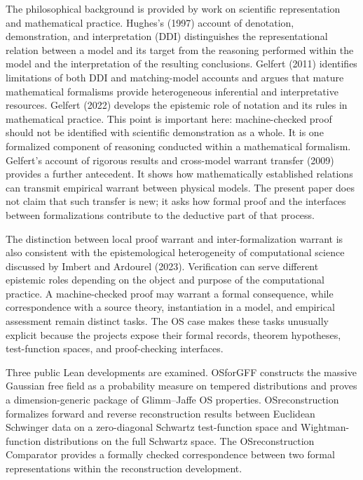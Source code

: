 \documentclass[pdflatex,sn-apa]{sn-jnl}
\begin{document}
The philosophical background is provided by work on scientific representation and mathematical practice. Hughes's (1997) account of denotation, demonstration, and interpretation (DDI) distinguishes the representational relation between a model and its target from the reasoning performed within the model and the interpretation of the resulting conclusions. Gelfert (2011) identifies limitations of both DDI and matching-model accounts and argues that mature mathematical formalisms provide heterogeneous inferential and interpretative resources. Gelfert (2022) develops the epistemic role of notation and its rules in mathematical practice. This point is important here: machine-checked proof should not be identified with scientific demonstration as a whole. It is one formalized component of reasoning conducted within a mathematical formalism. Gelfert's account of rigorous results and cross-model warrant transfer (2009) provides a further antecedent. It shows how mathematically established relations can transmit empirical warrant between physical models. The present paper does not claim that such transfer is new; it asks how formal proof and the interfaces between formalizations contribute to the deductive part of that process.

The distinction between local proof warrant and inter-formalization warrant is also consistent with the epistemological heterogeneity of computational science discussed by Imbert and Ardourel (2023). Verification can serve different epistemic roles depending on the object and purpose of the computational practice. A machine-checked proof may warrant a formal consequence, while correspondence with a source theory, instantiation in a model, and empirical assessment remain distinct tasks. The OS case makes these tasks unusually explicit because the projects expose their formal records, theorem hypotheses, test-function spaces, and proof-checking interfaces.

Three public Lean developments are examined. OSforGFF constructs the massive Gaussian free field as a probability measure on tempered distributions and proves a dimension-generic package of Glimm--Jaffe OS properties. OSreconstruction formalizes forward and reverse reconstruction results between Euclidean Schwinger data on a zero-diagonal Schwartz test-function space and Wightman-function distributions on the full Schwartz space. The OSreconstruction Comparator provides a formally checked correspondence between two formal representations within the reconstruction development.
\end{document}

